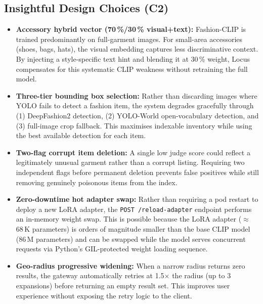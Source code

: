 \documentclass[12pt]{article}
\begin{document}
\subsection{Insightful Design Choices (C2)}

\begin{itemize}[leftmargin=*]
    \item \textbf{Accessory hybrid vector (70\,\%/30\,\% visual+text):} Fashion-CLIP is trained predominantly on full-garment images. For small-area accessories (shoes, bags, hats), the visual embedding captures less discriminative context. By injecting a style-specific text hint and blending it at 30\,\% weight, Locus compensates for this systematic CLIP weakness without retraining the full model.

    \item \textbf{Three-tier bounding box selection:} Rather than discarding images where YOLO fails to detect a fashion item, the system degrades gracefully through (1) DeepFashion2 detection, (2) YOLO-World open-vocabulary detection, and (3) full-image crop fallback. This maximises indexable inventory while using the best available detection for each item.

    \item \textbf{Two-flag corrupt item deletion:} A single low judge score could reflect a legitimately unusual garment rather than a corrupt listing. Requiring two independent flags before permanent deletion prevents false positives while still removing genuinely poisonous items from the index.

    \item \textbf{Zero-downtime hot adapter swap:} Rather than requiring a pod restart to deploy a new LoRA adapter, the \texttt{POST /reload-adapter} endpoint performs an in-memory weight swap. This is possible because the LoRA adapter ($\approx$68\,K parameters) is orders of magnitude smaller than the base CLIP model (86\,M parameters) and can be swapped while the model serves concurrent requests via Python's GIL-protected weight loading sequence.

    \item \textbf{Geo-radius progressive widening:} When a narrow radius returns zero results, the gateway automatically retries at 1.5$\times$ the radius (up to 3 expansions) before returning an empty result set. This improves user experience without exposing the retry logic to the client.
\end{itemize}
\end{document}
